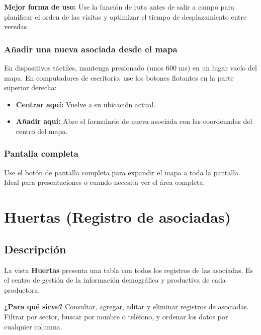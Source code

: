 \documentclass[12pt]{article}
\begin{document}
\begin{tipbox}
  \textbf{Mejor forma de uso:} Use la función de ruta antes de salir a campo para planificar el orden de las visitas y optimizar el tiempo de desplazamiento entre veredas.
\end{tipbox}

\subsubsection{Añadir una nueva asociada desde el mapa}
En dispositivos táctiles, mantenga presionado (unos 600 ms) en un lugar vacío del mapa. En computadores de escritorio, use los botones flotantes en la parte superior derecha:
\begin{itemize}[nosep]
  \item \textbf{Centrar aquí:} Vuelve a su ubicación actual.
  \item \textbf{Añadir aquí:} Abre el formulario de nueva asociada con las coordenadas del centro del mapa.
\end{itemize}

\subsubsection{Pantalla completa}
Use el botón de pantalla completa para expandir el mapa a toda la pantalla. Ideal para presentaciones o cuando necesita ver el área completa.

\section{Huertas (Registro de asociadas)}
\label{sec:huertas}

\subsection{Descripción}
\label{subsec:huertas-descripcion}

La vista \textbf{Huertas} presenta una tabla con todos los registros de las asociadas. Es el centro de gestión de la información demográfica y productiva de cada productora.

\begin{infobox}
  \textbf{¿Para qué sirve?} Consultar, agregar, editar y eliminar registros de asociadas. Filtrar por sector, buscar por nombre o teléfono, y ordenar los datos por cualquier columna.
\end{infobox}
\end{document}
